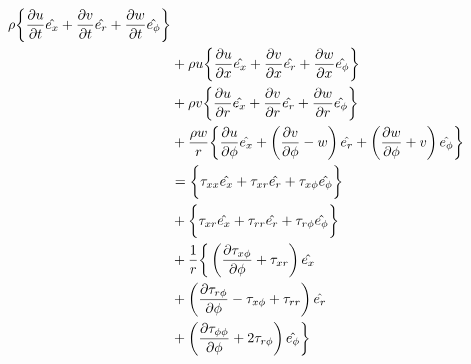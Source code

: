 \begin{equation}
  \begin{aligned}
    \rho \bigg\{ 
      \pdv{u}{t}\hat{e_x} 
    + \pdv{v}{t}\hat{e_r}
    + \pdv{w}{t}\hat{e_\phi} 
    \bigg\} \\
    &+ \rho u \bigg\{
    \pdv{u}{x}\hat{e_x} 
    + \pdv{v}{x}\hat{e_r}
    + \pdv{w}{x}\hat{e_\phi} 
    \bigg\}\\
    &+ \rho v \bigg\{
    \pdv{u}{r}\hat{e_x} 
    + \pdv{v}{r}\hat{e_r}
    + \pdv{w}{r}\hat{e_\phi} \bigg\}\\
    &+ \frac{\rho w}{r} \bigg\{
    \pdv{u}{\phi}\hat{e_x} 
    + \left(\pdv{v}{\phi}-w\right)\hat{e_r}
    + \left(\pdv{w}{\phi}+v\right)\hat{e_\phi} \bigg\} \\
    &= \bigg\{
    \tau_{xx}\hat{e_x}
    + \tau_{xr}\hat{e_r}
    + \tau_{x\phi}\hat{e_\phi}
    \bigg\} \\
  &+ \bigg\{
    \tau_{xr}\hat{e_x}
    + \tau_{rr}\hat{e_r}
    + \tau_{r\phi}\hat{e_\phi}
  \bigg\} \\
  &+ \frac{1}{r} \bigg\{
    \left(\pdv{\tau_{x\phi}}{\phi} + \tau_{xr}\right) \hat{e_x} \\
    &+ \left(\pdv{\tau_{r\phi}}{\phi} - \tau_{x\phi} + \tau_{rr}\right)\hat{e_r} \\
  &+ \left(\pdv{\tau_{\phi\phi}}{\phi} + 2\tau_{r\phi}\right)\hat{e_\phi} 
  \bigg\}
  \end{aligned}
\end{equation}

